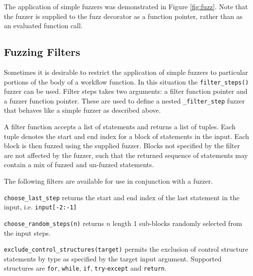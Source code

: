 \documentclass{sig-alternate}
\newenvironment{FunctionList}{%
\lstset{basicstyle=\ttfamily\bfseries\small}
\begin{list}{}{\leftmargin=5pt}
}{\end{list}\lstset{basicstyle=\ttfamily\small}}
\begin{document}
 The application of simple fuzzers was demonstrated in Figure \ref{fig:fuzz}.  Note that the fuzzer is supplied to the
 fuzz decorator as a function pointer, rather than as an evaluated function call.


 \subsection{Fuzzing Filters}


 Sometimes it is desirable to restrict the application of simple fuzzers to particular portions of the body of a
 workflow function.  In this situation the \lstinline!filter_steps()! fuzzer can be used.  Filter steps takes two
 arguments: a filter function pointer and a fuzzer function pointer.  These are used to define a nested
 \lstinline!_filter_step! fuzzer that behaves like a simple fuzzer as described above.

 A filter function accepts a list of statements and returns a list of tuples.  Each tuple denotes the start and end
 index for a block of statements in the input.  Each block is then fuzzed using the supplied fuzzer.  Blocks not
 specified by the filter are not affected by the fuzzer, such that the returned sequence of statements may contain a mix
 of fuzzed and un-fuzzed statements.

 The following filters are available for use in conjunction with a fuzzer.

 \begin{FunctionList}

 \item \lstinline!choose_last_step! returns the start and end index of the last statement in the input,
   i.e. \lstinline!input[-2:-1]!

 \item \lstinline!choose_random_steps(n)!  returns $n$ length 1 sub-blocks randomly selected from the input steps.

 \item \lstinline!exclude_control_structures(target)! permits the exclusion of control structure statements by type as
   specified by the target input argument. Supported structures are \lstinline!for!, \lstinline!while!, \lstinline!if!,
   \lstinline!try!-\lstinline!except! and \lstinline!return!.

 \end{FunctionList}
\end{document}
